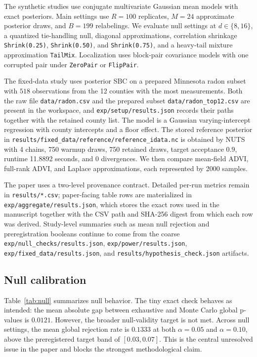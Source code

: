 \documentclass[10pt,twocolumn]{article}
\newcommand{\R}{R}
\newcommand{\M}{M}
\newcommand{\B}{B}
\newcommand{\1}{\mathbf{1}}
\begin{document}
The synthetic studies use conjugate multivariate Gaussian mean models with exact posteriors. Main settings use $\R=100$ replicates, $\M=24$ approximate posterior draws, and $\B=199$ relabelings. We evaluate null settings at $d \in \{8,16\}$, a quantized tie-handling null, diagonal approximations, correlation shrinkage \texttt{Shrink(0.25)}, \texttt{Shrink(0.50)}, and \texttt{Shrink(0.75)}, and a heavy-tail mixture approximation \texttt{TailMix}. Localization uses block-pair covariance models with one corrupted pair under \texttt{ZeroPair} or \texttt{FlipPair}.

The fixed-data study uses posterior SBC on a prepared Minnesota radon subset with $518$ observations from the 12 counties with the most measurements. Both the raw file \texttt{data/radon.csv} and the prepared subset \texttt{data/radon\_top12.csv} are present in the workspace, and \texttt{exp/setup/results.json} records their paths together with the retained county list. The model is a Gaussian varying-intercept regression with county intercepts and a floor effect. The stored reference posterior in \texttt{results/fixed\_data/reference/reference\_idata.nc} is obtained by NUTS with 4 chains, 750 warmup draws, 750 retained draws, target acceptance $0.9$, runtime 11.8892 seconds, and 0 divergences. We then compare mean-field ADVI, full-rank ADVI, and Laplace approximations, each represented by 2000 samples.

The paper uses a two-level provenance contract. Detailed per-run metrics remain in \texttt{results/*.csv}; paper-facing table rows are materialized in \texttt{exp/aggregate/results.json}, which stores the exact rows used in the manuscript together with the CSV path and SHA-256 digest from which each row was derived. Study-level summaries such as mean null rejection and preregistration booleans continue to come from the coarse \texttt{exp/null\_checks/results.json}, \texttt{exp/power/results.json}, \texttt{exp/fixed\_data/results.json}, and \texttt{results/hypothesis\_check.json} artifacts.

\subsection{Null calibration}
Table~\ref{tab:null} summarizes null behavior. The tiny exact check behaves as intended: the mean absolute gap between exhaustive and Monte Carlo global p-values is $0.0121$. However, the broader null-validity target is not met. Across null settings, the mean global rejection rate is $0.1333$ at both $\alpha=0.05$ and $\alpha=0.10$, above the preregistered target band of $[0.03, 0.07]$. This is the central unresolved issue in the paper and blocks the strongest methodological claim.
\end{document}
